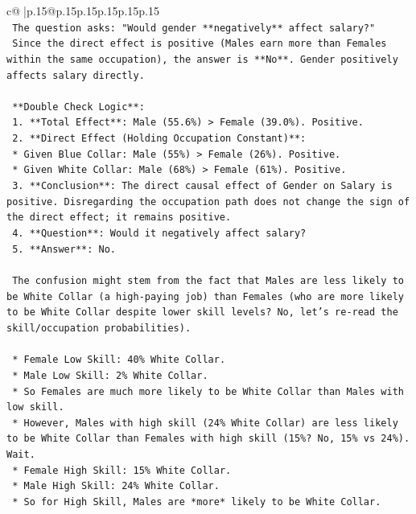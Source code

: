 \documentclass{article}
\begin{document}
{\begin{supertabular}{c@{$\;$}|p{.15\linewidth}@{}p{.15\linewidth}p{.15\linewidth}p{.15\linewidth}p{.15\linewidth}p{.15\linewidth}}
{{{\\ 
\texttt{    The question asks: "Would gender **negatively** affect salary?"} \\
\texttt{    Since the direct effect is positive (Males earn more than Females within the same occupation), the answer is **No**. Gender positively affects salary directly.} \\
\\ 
\texttt{    **Double Check Logic**:} \\
\texttt{    1.  **Total Effect**: Male (55.6\%) > Female (39.0\%). Positive.} \\
\texttt{    2.  **Direct Effect (Holding Occupation Constant)**:} \\
\texttt{        *   Given Blue Collar: Male (55\%) > Female (26\%). Positive.} \\
\texttt{        *   Given White Collar: Male (68\%) > Female (61\%). Positive.} \\
\texttt{    3.  **Conclusion**: The direct causal effect of Gender on Salary is positive. Disregarding the occupation path does not change the sign of the direct effect; it remains positive.} \\
\texttt{    4.  **Question**: Would it negatively affect salary?} \\
\texttt{    5.  **Answer**: No.} \\
\\ 
\texttt{    The confusion might stem from the fact that Males are less likely to be White Collar (a high{-}paying job) than Females (who are more likely to be White Collar despite lower skill levels? No, let's re{-}read the skill/occupation probabilities).} \\
\\ 
\texttt{    *   Female Low Skill: 40\% White Collar.} \\
\texttt{    *   Male Low Skill: 2\% White Collar.} \\
\texttt{    *   So Females are much more likely to be White Collar than Males with low skill.} \\
\texttt{    *   However, Males with high skill (24\% White Collar) are less likely to be White Collar than Females with high skill (15\%? No, 15\% vs 24\%). Wait.} \\
\texttt{        *   Female High Skill: 15\% White Collar.} \\
\texttt{        *   Male High Skill: 24\% White Collar.} \\
\texttt{    *   So for High Skill, Males are *more* likely to be White Collar.} \\
}}}
\end{supertabular}}
\end{document}
